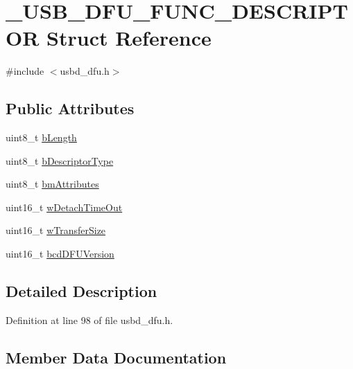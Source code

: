 \hypertarget{struct___u_s_b___d_f_u___f_u_n_c___d_e_s_c_r_i_p_t_o_r}{}\section{\+\_\+\+U\+S\+B\+\_\+\+D\+F\+U\+\_\+\+F\+U\+N\+C\+\_\+\+D\+E\+S\+C\+R\+I\+P\+T\+OR Struct Reference}
\label{struct___u_s_b___d_f_u___f_u_n_c___d_e_s_c_r_i_p_t_o_r}


{\ttfamily \#include $<$usbd\+\_\+dfu.\+h$>$}

\subsection*{Public Attributes}
\begin{DoxyCompactItemize}
\item 
uint8\+\_\+t \hyperlink{struct___u_s_b___d_f_u___f_u_n_c___d_e_s_c_r_i_p_t_o_r_a87a03979bd723f81bb50ef42b306293e}{b\+Length}
\item 
uint8\+\_\+t \hyperlink{struct___u_s_b___d_f_u___f_u_n_c___d_e_s_c_r_i_p_t_o_r_a89748491aeed40b066125858de36f32a}{b\+Descriptor\+Type}
\item 
uint8\+\_\+t \hyperlink{struct___u_s_b___d_f_u___f_u_n_c___d_e_s_c_r_i_p_t_o_r_a5c52598802d2f0b806b60c0b7dc7daab}{bm\+Attributes}
\item 
uint16\+\_\+t \hyperlink{struct___u_s_b___d_f_u___f_u_n_c___d_e_s_c_r_i_p_t_o_r_adf39c3370bc0103fa7e7fb4b2f55997f}{w\+Detach\+Time\+Out}
\item 
uint16\+\_\+t \hyperlink{struct___u_s_b___d_f_u___f_u_n_c___d_e_s_c_r_i_p_t_o_r_aa2d15000591e2a01b63bc46e53dde84a}{w\+Transfer\+Size}
\item 
uint16\+\_\+t \hyperlink{struct___u_s_b___d_f_u___f_u_n_c___d_e_s_c_r_i_p_t_o_r_acc4e2bf500911850131421896697e503}{bcd\+D\+F\+U\+Version}
\end{DoxyCompactItemize}


\subsection{Detailed Description}


Definition at line 98 of file usbd\+\_\+dfu.\+h.



\subsection{Member Data Documentation}
\mbox{\label{struct___u_s_b___d_f_u___f_u_n_c___d_e_s_c_r_i_p_t_o_r_acc4e2bf500911850131421896697e503}} 
